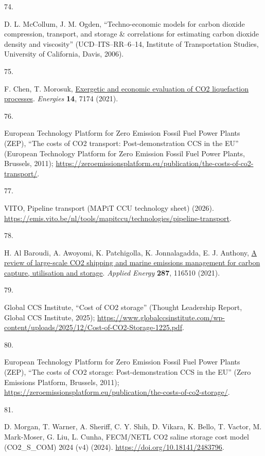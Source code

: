 \documentclass[
  letterpaper,
]{article}
\newlength{\cslhangindent}
\newlength{\csllabelwidth}
\newenvironment{CSLReferences}[2] %
 {\begin{list}{}{%
  \setlength{\itemindent}{0pt}
  \setlength{\leftmargin}{0pt}
  \setlength{\parsep}{0pt}
  \ifodd #1
   \setlength{\leftmargin}{\cslhangindent}
   \setlength{\itemindent}{-1\cslhangindent}
  \fi
  \setlength{\itemsep}{#2\baselineskip}}}
 {\end{list}}
\newcommand{\CSLLeftMargin}[1]{\parbox[t]{\csllabelwidth}{\strut#1\strut}}
\newcommand{\CSLRightInline}[1]{\parbox[t]{\linewidth - \csllabelwidth}{\strut#1\strut}}
\begin{document}
\begin{CSLReferences}{0}{1}
\CSLLeftMargin{74. }%
\CSLRightInline{D. L. McCollum, J. M. Ogden, {``Techno-economic models
for carbon dioxide compression, transport, and storage \& correlations
for estimating carbon dioxide density and viscosity''}
(UCD--ITS--RR--6--14, Institute of Transportation Studies, University of
California, Davis, 2006).}

\CSLLeftMargin{75. }%
\CSLRightInline{F. Chen, T. Morosuk,
\href{https://doi.org/10.3390/en14217174}{Exergetic and economic
evaluation of {CO2} liquefaction processes}. \emph{Energies}
\textbf{14}, 7174 (2021).}

\CSLLeftMargin{76. }%
\CSLRightInline{European Technology Platform for Zero Emission Fossil
Fuel Power Plants (ZEP), {``The costs of {CO2} transport:
Post-demonstration {CCS} in the {EU}''} (European Technology Platform
for Zero Emission Fossil Fuel Power Plants, Brussels, 2011);
\url{https://zeroemissionsplatform.eu/publication/the-costs-of-co2-transport/}.}

\CSLLeftMargin{77. }%
\CSLRightInline{VITO, Pipeline transport ({MAPiT CCU} technology sheet)
(2026).
\url{https://emis.vito.be/nl/tools/mapitccu/technologies/pipeline-transport}.}

\CSLLeftMargin{78. }%
\CSLRightInline{H. Al Baroudi, A. Awoyomi, K. Patchigolla, K.
Jonnalagadda, E. J. Anthony,
\href{https://doi.org/10.1016/j.apenergy.2021.116510}{A review of
large-scale {CO}2 shipping and marine emissions management for carbon
capture, utilisation and storage}. \emph{Applied Energy} \textbf{287},
116510 (2021).}

\CSLLeftMargin{79. }%
\CSLRightInline{Global CCS Institute, {``Cost of {CO}2 storage''}
(Thought Leadership Report, Global CCS Institute, 2025);
\url{https://www.globalccsinstitute.com/wp-content/uploads/2025/12/Cost-of-CO2-Storage-1225.pdf}.}

\CSLLeftMargin{80. }%
\CSLRightInline{European Technology Platform for Zero Emission Fossil
Fuel Power Plants (ZEP), {``The costs of {CO}2 storage:
Post-demonstration {CCS} in the {EU}''} (Zero Emissions Platform,
Brussels, 2011);
\url{https://zeroemissionsplatform.eu/publication/the-costs-of-co2-storage/}.}

\CSLLeftMargin{81. }%
\CSLRightInline{D. Morgan, T. Warner, A. Sheriff, C. Y. Shih, D. Vikara,
K. Bello, T. Vactor, M. Mark-Moser, G. Liu, L. Cunha, {FECM/NETL CO2}
saline storage cost model ({CO2\_S\_COM}) 2024 (v4) (2024).
\url{https://doi.org/10.18141/2483796}.}


\end{CSLReferences}
\end{document}
